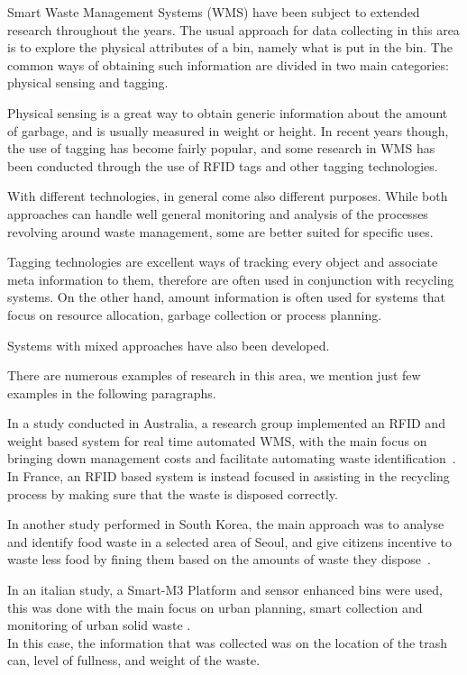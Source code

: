 Smart Waste Management Systems (WMS) have been subject to extended research throughout the years.
The usual approach for data collecting in this area is to explore the physical attributes of a bin, namely what is put in the bin.
The common ways of obtaining such information are divided in two main categories: physical sensing and tagging.

Physical sensing is a great way to obtain generic information about the amount of garbage, and is usually measured in weight or height.
In recent years though, the use of tagging has become fairly popular, and some research in WMS has been conducted through the use of RFID tags and other tagging technologies.

With different technologies, in general come also different purposes.
While both approaches can handle well general monitoring and analysis of the processes revolving around waste management, some are better suited for specific uses.

Tagging technologies are excellent ways of tracking every object and associate meta information to them, therefore are often used in conjunction with recycling systems.
On the other hand, amount information is often used for systems that focus on resource allocation, garbage collection or process planning.

Systems with mixed approaches have also been developed.

There are numerous examples of research in this area, we mention just few examples in the following paragraphs.

In a study conducted in Australia, a research group implemented an RFID and weight based system for real time automated WMS, with the main focus on bringing down management costs and facilitate automating waste identification~\cite{australia}.
In France, an RFID based system is instead focused in assisting in the recycling process by making sure that the waste is disposed correctly\cite{france}.

In another study performed in South Korea, the main approach was to analyse and identify food waste in a selected area of Seoul, and give citizens incentive to waste less food by fining them based on the amounts of waste they dispose~\cite{korea}.

In an italian study, a Smart-M3 Platform and sensor enhanced bins were used, this was done with the main focus on urban planning, smart collection and  monitoring of urban solid waste \cite{catania}.\\
In this case, the information that was collected was on the location of the trash can, level of fullness, and weight of the waste.


